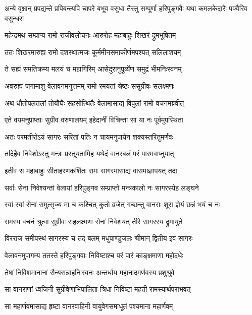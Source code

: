 \threelineshloka
{अन्ये वृक्षान् प्रपद्यन्ते प्रपिबन्त्यपि चापरे}
{बभूव वसुधा तैस्तु सम्पूर्णा हरिपुङ्गवैः}
{यथा कमलकेदारैः पक्वैरिव वसुन्धरा} %

\twolineshloka
{महेन्द्रमथ सम्प्राप्य रामो राजीवलोचनः}
{आरुरोह महाबाहुः शिखरं द्रुमभूषितम्} %

\twolineshloka
{ततः शिखरमारुह्य रामो दशरथात्मजः}
{कूर्ममीनसमाकीर्णमपश्यत् सलिलाशयम्} %

\twolineshloka
{ते सह्यं समतिक्रम्य मलयं च महागिरिम्}
{आसेदुरानुपूर्व्येण समुद्रं भीमनिःस्वनम्} %

\twolineshloka
{अवरुह्य जगामाशु वेलावनमनुत्तमम्}
{रामो रमयतां श्रेष्ठः ससुग्रीवः सलक्ष्मणः} %

\twolineshloka
{अथ धौतोपलतलां तोयौघैः सहसोत्थितैः}
{वेलामासाद्य विपुलां रामो वचनमब्रवीत्} %

\twolineshloka
{एते वयमनुप्राप्ताः सुग्रीव वरुणालयम्}
{इहेदानीं विचिन्ता सा या नः पूर्वमुपस्थिता} %

\twolineshloka
{अतः परमतीरोऽयं सागरः सरितां पतिः}
{न चायमनुपायेन शक्यस्तरितुमर्णवः} %

\twolineshloka
{तदिहैव निवेशोऽस्तु मन्त्रः प्रस्तूयतामिह}
{यथेदं वानरबलं परं पारमवाप्नुयात्} %

\twolineshloka
{इतीव स महाबाहुः सीताहरणकर्शितः}
{रामः सागरमासाद्य वासमाज्ञापयत् तदा} %

\twolineshloka
{सर्वाः सेना निवेश्यन्तां वेलायां हरिपुङ्गव}
{सम्प्राप्तो मन्त्रकालो नः सागरस्येह लङ्घने} %

\twolineshloka
{स्वां स्वां सेनां समुत्सृज्य मा च कश्चित् कुतो व्रजेत्}
{गच्छन्तु वानराः शूरा ज्ञेयं छन्नं भयं च नः} %

\twolineshloka
{रामस्य वचनं श्रुत्वा सुग्रीवः सहलक्ष्मणः}
{सेनां निवेशयत् तीरे सागरस्य द्रुमायुते} %

\twolineshloka
{विरराज समीपस्थं सागरस्य च तद् बलम्}
{मधुपाण्डुजलः श्रीमान् द्वितीय इव सागरः} %

\twolineshloka
{वेलावनमुपागम्य ततस्ते हरिपुङ्गवाः}
{निविष्टाश्च परं पारं काङ्क्षमाणा महोदधेः} %

\twolineshloka
{तेषां निविशमानानां सैन्यसन्नाहनिःस्वनः}
{अन्तर्धाय महानादमर्णवस्य प्रशुश्रुवे} %

\twolineshloka
{सा वानराणां ध्वजिनी सुग्रीवेणाभिपालिता}
{त्रिधा निविष्टा महती रामस्यार्थपराभवत्} %

\twolineshloka
{सा महार्णवमासाद्य हृष्टा वानरवाहिनी}
{वायुवेगसमाधूतं पश्यमाना महार्णवम्} %

